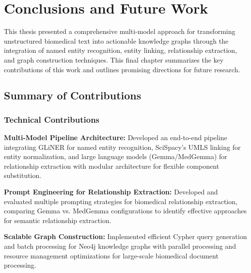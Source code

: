 
\chapter{Conclusions and Future Work} %

\label{Chapter5} %




This thesis presented a comprehensive multi-model approach for transforming unstructured biomedical text into actionable knowledge graphs through the integration of named entity recognition, entity linking, relationship extraction, and graph construction techniques. This final chapter summarizes the key contributions of this work and outlines promising directions for future research.


\section{Summary of Contributions}

\subsection{Technical Contributions}

\textbf{Multi-Model Pipeline Architecture:} Developed an end-to-end pipeline integrating GLiNER for named entity recognition, SciSpacy's UMLS linking for entity normalization, and large language models (Gemma/MedGemma) for relationship extraction with modular architecture for flexible component substitution.

\textbf{Prompt Engineering for Relationship Extraction:} Developed and evaluated multiple prompting strategies for biomedical relationship extraction, comparing Gemma vs. MedGemma configurations to identify effective approaches for semantic relationship extraction.

\textbf{Scalable Graph Construction:} Implemented efficient Cypher query generation and batch processing for Neo4j knowledge graphs with parallel processing and resource management optimizations for large-scale biomedical document processing.

